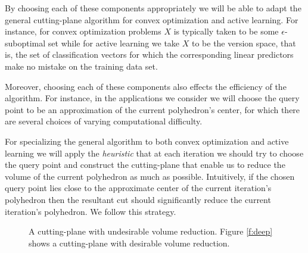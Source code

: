 \documentclass[11pt]{amsart}
\theoremstyle{definition}
\theoremstyle{remark}
\begin{document}
        By choosing each of these components appropriately we will be able to adapt the general cutting-plane algorithm for convex optimization and active learning. For instance, for convex optimization problems $X$ is typically taken to be some $\epsilon$-suboptimal set while for active learning we take $X$ to be the version space, that is, the set of classification vectors for which the corresponding linear predictors make no mistake on the training data set. 

        Moreover, choosing each of these components also effects the efficiency of the algorithm. For instance, in the applications we  consider we will choose the query point to be an approximation of the current polyhedron's center, for which there are several choices of varying computational difficulty. 

        For specializing the general algorithm to both convex optimization and active learning we will apply the \emph{heuristic} that at each iteration we should try to choose the query point and construct the cutting-plane that enable us to reduce the volume of the current polyhedron as much as possible. Intuitively, if the chosen query point lies close to the approximate center of the current iteration's polyhedron then the resultant cut should significantly reduce the current iteration's polyhedron. We follow this strategy. 

        \begin{figure}[t]
            \centering
            \caption{A cutting-plane with undesirable volume reduction. Figure \ref{f:deep} shows a cutting-plane with desirable volume reduction.}
        \end{figure}
        \FloatBarrier
\end{document}
